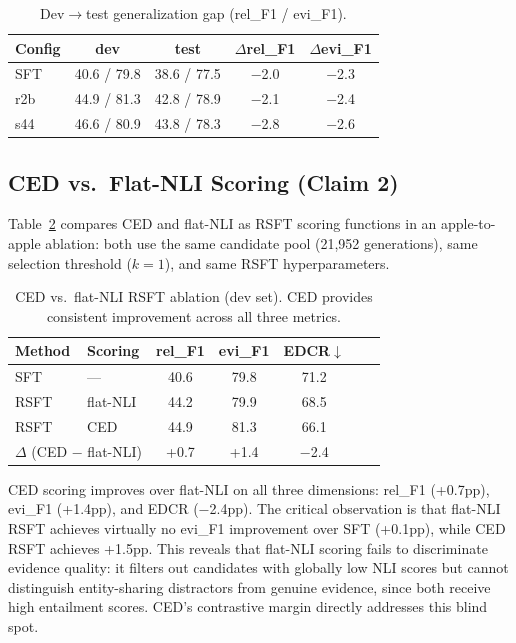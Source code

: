 \documentclass[11pt,a4paper]{article}
\begin{document}
\begin{table}[t]
\centering
\small
\begin{tabular}{lcccc}
\toprule
\textbf{Config} & \textbf{dev} & \textbf{test} & $\Delta$\textbf{rel\_F1} & $\Delta$\textbf{evi\_F1} \\
\midrule
SFT & 40.6 / 79.8 & 38.6 / 77.5 & $-$2.0 & $-$2.3 \\
r2b & 44.9 / 81.3 & 42.8 / 78.9 & $-$2.1 & $-$2.4 \\
s44 & 46.6 / 80.9 & 43.8 / 78.3 & $-$2.8 & $-$2.6 \\
\bottomrule
\end{tabular}
\caption{Dev$\to$test generalization gap (rel\_F1 / evi\_F1).}
\label{tab:devtest}
\end{table}

\subsection{CED vs.\ Flat-NLI Scoring (Claim 2)}
\label{sec:ced_vs_nli}

Table~\ref{tab:ced_nli} compares CED and flat-NLI as RSFT scoring functions in an apple-to-apple ablation: both use the same candidate pool (21,952 generations), same selection threshold ($k{=}1$), and same RSFT hyperparameters.

\begin{table}[t]
\centering
\small
\begin{tabular}{llccccc}
\toprule
\textbf{Method} & \textbf{Scoring} & \textbf{rel\_F1} & \textbf{evi\_F1} & \textbf{EDCR}$\downarrow$ \\
\midrule
SFT & --- & 40.6 & 79.8 & 71.2 \\
RSFT & flat-NLI & 44.2 & 79.9 & 68.5 \\
RSFT & CED & 44.9 & 81.3 & 66.1 \\
\midrule
\multicolumn{2}{l}{$\Delta$ (CED $-$ flat-NLI)} & +0.7 & +1.4 & $-$2.4 \\
\bottomrule
\end{tabular}
\caption{CED vs.\ flat-NLI RSFT ablation (dev set). CED provides consistent improvement across all three metrics.}
\label{tab:ced_nli}
\end{table}

CED scoring improves over flat-NLI on all three dimensions: rel\_F1 (+0.7pp), evi\_F1 (+1.4pp), and EDCR ($-$2.4pp). The critical observation is that flat-NLI RSFT achieves virtually no evi\_F1 improvement over SFT (+0.1pp), while CED RSFT achieves +1.5pp. This reveals that flat-NLI scoring fails to discriminate evidence quality: it filters out candidates with globally low NLI scores but cannot distinguish entity-sharing distractors from genuine evidence, since both receive high entailment scores. CED's contrastive margin directly addresses this blind spot.
\end{document}
